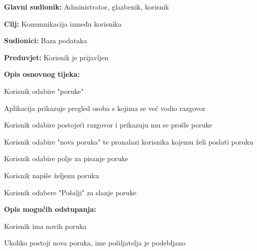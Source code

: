 				\noindent {}
				\begin{packed_item}

					\item \textbf{Glavni sudionik: }Administrator, glazbenik, korisnik
					\item  \textbf{Cilj:} Komunnikacija između korisnika
					\item  \textbf{Sudionici:} Baza podataka
					\item  \textbf{Preduvjet:} Korisnik je prijavljen
					\item  \textbf{Opis osnovnog tijeka:}
					
					\item[] \begin{packed_enum}

							\item Korisnik odabire "poruke"
							\item Aplikacija prikazuje pregled osoba s kojima se već vodio razgovor
							\item Korisnik odabire postojeći razgovor i prikazuju mu se prošle poruke
							\item Korisnik odabire "nova poruka" te pronalazi korisnika kojemu želi poslati poruku
							\item Korisnik odabire polje za pisanje poruke
							\item Korisnik napiše željenu poruku
							\item Korisnik odabere "Pošalji" za slanje poruke
					\end{packed_enum}
				
					\item  \textbf{Opis mogućih odstupanja:}
				
					\item[] \begin{packed_item}

						\item[2.a] Korisnik ima novih poruka
						\item[] \begin{packed_enum}
							\item Ukoliko postoji nova poruka, ime pošiljatelja je podebljano
						\end{packed_enum}
					\end{packed_item}
				\end{packed_item}
			
